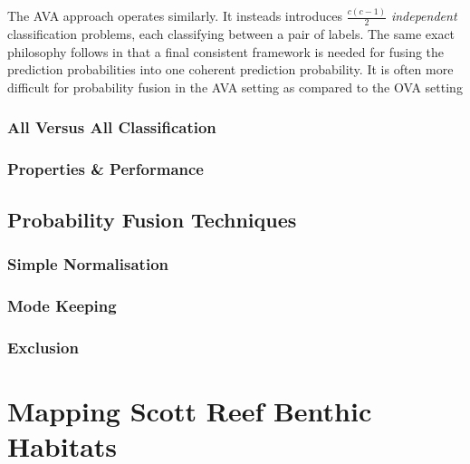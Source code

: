 				The AVA approach operates similarly. It insteads introduces $\frac{c (c - 1)}{2}$ \textit{independent} classification problems, each classifying between a pair of labels. The same exact philosophy follows in that a final consistent framework is needed for fusing the prediction probabilities into one coherent prediction probability. It is often more difficult for probability fusion in the AVA setting as compared to the OVA setting
				
			\subsubsection{All Versus All Classification}
			\label{BenthicHabitatMapping:Classification:MulticlassClassification:AVA}
			
			\subsubsection{Properties \& Performance}
			\label{BenthicHabitatMapping:Classification:MulticlassClassification:Performance}
			
		\subsection{Probability Fusion Techniques}
		\label{BenthicHabitatMapping:Classification:ProbabilityFusion}
		
			\subsubsection{Simple Normalisation}
			\label{BenthicHabitatMapping:Classification:ProbabilityFusion:SimpleNormalisation}
				
			\subsubsection{Mode Keeping}
			\label{BenthicHabitatMapping:Classification:ProbabilityFusion:ModeKeeping}
				
			\subsubsection{Exclusion}
			\label{BenthicHabitatMapping:Classification:ProbabilityFusion:Exclusion}
			
	\newpage
	\section{Mapping Scott Reef Benthic Habitats}
	\label{BenthicHabitatMapping:ScottReef}

